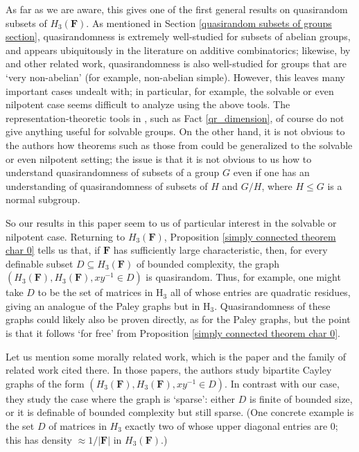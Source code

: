 \documentclass[10pt]{article}
\begin{document}
{ As far as we are aware, this gives one of the first general results on quasirandom subsets of $H_3(\mathbf{F})$. As mentioned in Section \ref{quasirandom subsets of groups section}, quasirandomness is extremely well-studied for subsets of abelian groups, and appears ubiquitously in the literature on additive combinatorics; likewise, by \cite{gowers_groups} and other related work, quasirandomness is also well-studied for groups that are `very non-abelian' (for example, non-abelian simple). However, this leaves many important cases undealt with; in particular, for example, the solvable or even nilpotent case seems difficult to analyze using the above tools. The representation-theoretic tools in \cite{gowers_groups}, such as Fact \ref{qr_dimension}, of course do not give anything useful for solvable groups. On the other hand, it is not obvious to the authors how theorems such as those from \cite{green} could be generalized to the solvable or even nilpotent setting; the issue is that it is not obvious to us how to understand quasirandomness of subsets of a group $G$ even if one has an understanding of quasirandomness of subsets of $H$ and $G/H$, where $H\leqslant G$ is a normal subgroup.

 So our results in this paper seem to us of particular interest in the solvable or nilpotent case. Returning to $H_3(\mathbf{F})$, Proposition \ref{simply connected theorem char 0} tells us that, if $\mathbf{F}$ has sufficiently large characteristic, then, for every definable subset $D\subseteq H_3(\mathbf{F})$ of bounded complexity, the graph $(H_3(\mathbf{F}),H_3(\mathbf{F}),xy^{-1}\in D)$ is quasirandom. Thus, for example, one might take $D$ to be the set of matrices in $\mathrm{H}_3$ all of whose entries are quadratic residues, giving an analogue of the Paley graphs but in $\mathrm{H}_3$. Quasirandomness of these graphs could likely also be proven directly, as for the Paley graphs, but the point is that it follows `for free' from Proposition \ref{simply connected theorem char 0}.
 
 Let us mention some morally related work, which is the paper \cite{heisenberg_graphs} and the family of related work cited there. In those papers, the authors study bipartite Cayley graphs of the form $(H_3(\mathbf{F}),H_3(\mathbf{F}),xy^{-1}\in D)$. In contrast with our case, they study the case where the graph is `sparse': either $D$ is finite of bounded size, or it is definable of bounded complexity but still sparse. (One concrete example is the set $D$ of matrices in $H_3$ exactly two of whose upper diagonal entries are $0$; this has density $\approx1/|\mathbf{F}|$ in $H_3(\mathbf{F})$.)
 
}
\end{document}
